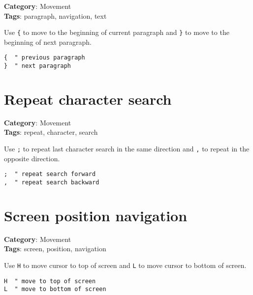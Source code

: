 {{{{{{{{\textbf{Category}: Movement\\ \textbf{Tags}: paragraph, navigation, text
\vspace{0.5cm}

Use {\footnotesize \Verb§{§} to move to the beginning of current paragraph and {\footnotesize \Verb§}§} to move to the beginning of next paragraph.

\begin{Exa*}{}
\begin{Verbatim}[fontsize=\footnotesize, breaklines, breakanywhere]
{  " previous paragraph
}  " next paragraph
\end{Verbatim}
\end{Exa*}

\section{Repeat character search}

\textbf{Category}: Movement\\ \textbf{Tags}: repeat, character, search
\vspace{0.5cm}

Use {\footnotesize \Verb§;§} to repeat last character search in the same direction and {\footnotesize \Verb§,§} to repeat in the opposite direction.

\begin{Exa*}{}
\begin{Verbatim}[fontsize=\footnotesize, breaklines, breakanywhere]
;  " repeat search forward
,  " repeat search backward
\end{Verbatim}
\end{Exa*}

\section{Screen position navigation}

\textbf{Category}: Movement\\ \textbf{Tags}: screen, position, navigation
\vspace{0.5cm}

Use {\footnotesize \Verb§H§} to move cursor to top of screen and {\footnotesize \Verb§L§} to move cursor to bottom of screen.

\begin{Exa*}{}
\begin{Verbatim}[fontsize=\footnotesize, breaklines, breakanywhere]
H  " move to top of screen
L  " move to bottom of screen
\end{Verbatim}
\end{Exa*}

}}}}}}}}
